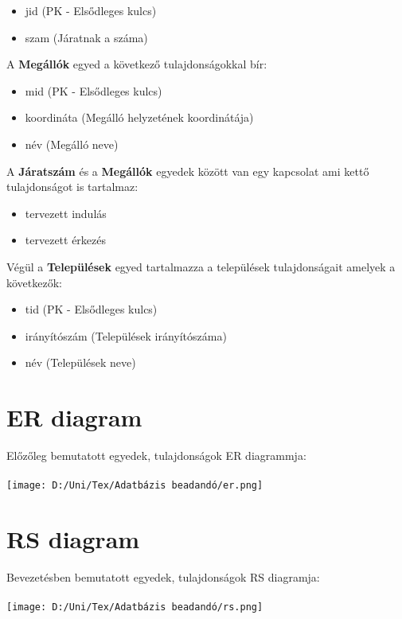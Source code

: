 \documentclass[12pt]{article}
\begin{document}
\begin{itemize}
\item jid (PK - Elsődleges kulcs)
\item szam (Járatnak a száma)
\end{itemize}
A \textbf{Megállók} egyed a következő tulajdonságokkal bír:
\begin{itemize}
\item mid (PK - Elsődleges kulcs)
\item koordináta (Megálló helyzetének koordinátája)
\item név (Megálló neve)
\end{itemize}
A \textbf{Járatszám} és a \textbf{Megállók} egyedek között van egy kapcsolat ami kettő tulajdonságot is tartalmaz:
\begin{itemize}
\item tervezett indulás
\item tervezett érkezés
\end{itemize}
Végül a \textbf{Települések} egyed tartalmazza a települések tulajdonságait amelyek a következők:
\begin{itemize}
\item tid (PK - Elsődleges kulcs)
\item irányítószám (Települések irányítószáma)
\item név (Települések neve)
\end{itemize}
\newpage
\section{ER diagram}
Előzőleg bemutatott egyedek, tulajdonságok ER diagrammja:\\
\\
\texttt{[image: D:/Uni/Tex/Adatbázis beadandó/er.png]}
\newpage
\section{RS diagram}
Bevezetésben bemutatott egyedek, tulajdonságok RS diagramja:\\
\\
\texttt{[image: D:/Uni/Tex/Adatbázis beadandó/rs.png]}
\end{document}
